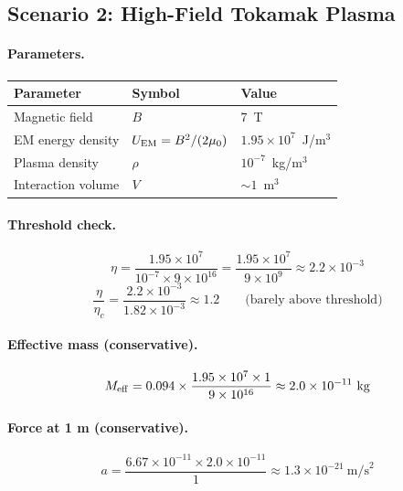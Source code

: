 \documentclass[12pt,a4paper]{article}
\begin{document}
\subsection{Scenario 2: High-Field Tokamak Plasma}

\paragraph{Parameters.}
\begin{center}
\begin{tabular}{lll}
\toprule
Parameter & Symbol & Value \\
\midrule
Magnetic field & $B$ & 7~T \\
EM energy density & $U_{\rm EM} = B^2/(2\mu_0)$ & $1.95 \times 10^7$~J/m$^3$ \\
Plasma density & $\rho$ & $10^{-7}$~kg/m$^3$ \\
Interaction volume & $V$ & $\sim 1$~m$^3$ \\
\bottomrule
\end{tabular}
\end{center}

\paragraph{Threshold check.}
\begin{equation}
\eta = \frac{1.95 \times 10^7}{10^{-7} \times 9 \times 10^{16}}
= \frac{1.95 \times 10^7}{9 \times 10^9} \approx 2.2 \times 10^{-3}
\end{equation}
\begin{equation}
\frac{\eta}{\eta_c} = \frac{2.2 \times 10^{-3}}{1.82 \times 10^{-3}} \approx 1.2
\qquad \text{(barely above threshold)}
\end{equation}

\paragraph{Effective mass (conservative).}
\begin{equation}
M_{\rm eff} = 0.094 \times \frac{1.95 \times 10^7 \times 1}{9 \times 10^{16}}
\approx 2.0 \times 10^{-11}~\text{kg}
\end{equation}

\paragraph{Force at 1 m (conservative).}
\begin{equation}
a = \frac{6.67 \times 10^{-11} \times 2.0 \times 10^{-11}}{1}
\approx 1.3 \times 10^{-21}~\text{m/s}^2
\end{equation}
\end{document}
